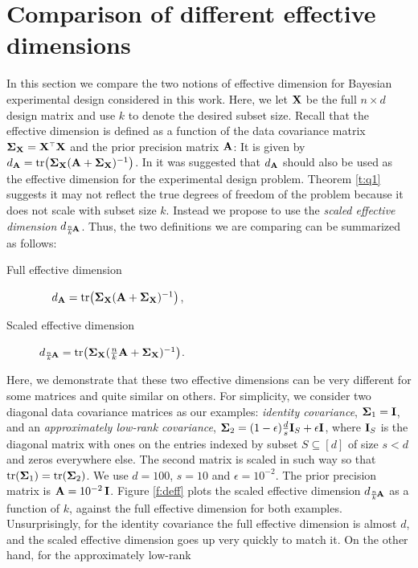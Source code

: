 \documentclass[thesis.tex]{subfiles}
\begin{document}
\section{Comparison of different effective dimensions}
\label{a:deff}
In this section we compare the two notions of effective dimension for
Bayesian experimental design considered in this work. Here, we let
$\mathbf X$ be the full $n\times d$ design matrix and use $k$ to denote the
desired subset size. Recall that the effective dimension is  defined
as a function of the data covariance matrix $\Sigmab_\X=\X^\top\X$ and
the prior precision matrix $\mathbf A$:
It is given by $d_{\mathbf A} =
\mathrm{tr}\big(\mathbf{\Sigma}_\mathbf X(\mathbf A+\mathbf{\Sigma}_\mathbf X)^{-1}\big)$. In
\cite{regularized-volume-sampling} it was suggested that $d_{\mathbf A}$
should also be used as the effective dimension for the experimental
design problem. Theorem \ref{t:q1} suggests it may not reflect the true degrees
of freedom of the problem because it does not scale with subset size
$k$. Instead we propose to use the \emph{scaled effective dimension}
$d_{\frac nk\!\mathbf A}$. Thus, the two definitions we are comparing can be
summarized as follows:
\begin{description}
  \item[Full effective dimension]\quad\ \ \,$d_{\mathbf A} =
    \mathrm{tr}\big(\mathbf{\Sigma}_\mathbf X(\mathbf A+\mathbf{\Sigma}_\mathbf X)^{-1}\big)$,
    \item[Scaled effective dimension] $d_{\frac nk\!\mathbf A} =
      \mathrm{tr}\big(\mathbf{\Sigma}_\mathbf X(\tfrac nk\mathbf A + \mathbf{\Sigma}_\mathbf X)^{-1}\big)$.
    \end{description}
    Here, we demonstrate that these two effective dimensions can be
    very different for some matrices and quite similar on others. For
    simplicity, we consider two diagonal data covariance matrices as
    our examples: \emph{identity covariance}, $\mathbf{\Sigma}_1 = \mathbf I$, and an
    \emph{approximately low-rank covariance}, $\mathbf{\Sigma}_2 =
    (1-\epsilon)\frac ds \mathbf I_S+\epsilon\mathbf I$, where $\mathbf I_S$ is the
    diagonal matrix with ones on the entries indexed by subset
    $S\subseteq [d]$ of
    size $s<d$ and zeros
    everywhere else. The second matrix is scaled in such way so that
    $\mathrm{tr}(\mathbf{\Sigma}_1)=\mathrm{tr}(\mathbf{\Sigma}_2)$. We use $d=100$, $s=10$ and
    $\epsilon=10^{-2}$. The prior precision matrix is
    $\mathbf A=10^{-2}\,\mathbf I$. Figure \ref{f:deff} plots the scaled effective
    dimension $d_{\frac nk\!\mathbf A}$ as a function of $k$, against the
    full effective dimension for both examples. Unsurprisingly, for
    the identity covariance the full effective dimension is almost
    $d$, and the scaled effective dimension goes up very quickly to
    match it. On the other hand, for the approximately low-rank
\end{document}
